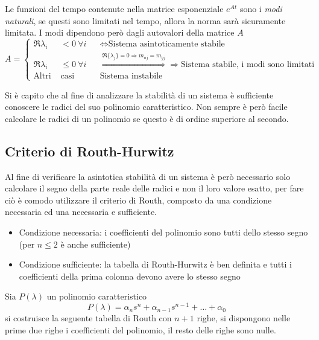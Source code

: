 Le funzioni del tempo contenute nella matrice esponenziale $e^{At}$ sono i
\textit{modi naturali}, se questi sono limitati nel tempo, allora la norma sarà
sicuramente limitata. I modi dipendono però dagli autovalori della matrice $A$
$$
A = \left\{\begin{aligned}
\Re{\lambda_i}&<0 \ \forall i & &\Leftrightarrow \text{Sistema asintoticamente
stabile}\\
\Re{\lambda_i} &\leq 0 \ \forall i &
&\stackrel{\Re\{\lambda_j\}=0\Rightarrow m_{aj}=m_{gj}}{\Rightarrow}
\Rightarrow \text{Sistema stabile, i modi sono limitati}\\
\text{Altri } &\text{casi } & & \text{Sistema instabile}
\end{aligned}
\right.$$

Si è capito che al fine di analizzare la stabilità di un sistema è sufficiente
conoscere le radici del suo polinomio caratteristico. Non sempre è però facile
calcolare le radici di un polinomio se questo è di ordine superiore al secondo.


\subsection{Criterio di Routh-Hurwitz}
Al fine di verificare la asintotica stabilità di un sistema è però necessario
solo calcolare il segno della parte reale delle radici e non il loro valore
esatto, per fare ciò è comodo utilizzare il criterio di Routh,
composto da una condizione necessaria ed una necessaria e sufficiente.
\begin{itemize}
\item Condizione necessaria: i coefficienti del polinomio sono tutti dello
stesso segno (per $n\leq2$ è anche sufficiente)
\item Condizione sufficiente: la tabella di Routh-Hurwitz è ben definita e
tutti i coefficienti della prima colonna devono avere lo stesso segno
\end{itemize}

Sia $P(\lambda)$ un polinomio caratteristico
$$
P(\lambda) = \alpha_ns^n + \alpha_{n-1}s^{n-1} + \ldots + \alpha_0
$$
si costruisce la seguente tabella di Routh con $n+1$ righe, si dispongono
nelle prime due righe i coefficienti del polinomio, il resto delle righe sono
nulle.

